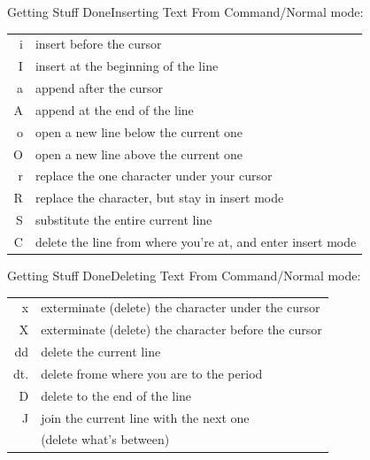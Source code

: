 \documentclass{beamer}
\begin{document}
\begin{frame}[c]{Getting Stuff Done}{Inserting Text}
    From Command/Normal mode:
    \begin{table}[htpb]
        \centering
        \begin{tabular}{r|l}
            i & insert before the cursor \\
            I & insert at the beginning of the line \\
            a & append after the cursor \\
            A & append at the end of the line \\
            o & open a new line below the current one \\
            O & open a new line above the current one \\
            r & replace the one character under your cursor \\
            R & replace the character, but stay in insert mode \\
            S & substitute the entire current line \\
            C & delete the line from where you're at, and enter insert mode \\
        \end{tabular}
    \end{table}
\end{frame}


\begin{frame}[c]{Getting Stuff Done}{Deleting Text}
    From Command/Normal mode:
    \begin{table}[htpb]
        \centering
        \begin{tabular}{r|l}
            x    & exterminate (delete) the character under the cursor \\
            X    & exterminate (delete) the character before the cursor \\
            dd   & delete the current line \\
            dt.  & delete frome where you are to the period \\
            D    & delete to the end of the line \\
            J    & join the current line with the next one \\
                 & (delete what's between) \\
        \end{tabular}
    \end{table}
\end{frame}
\end{document}
